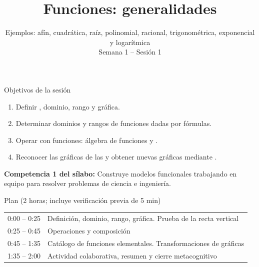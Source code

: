 \documentclass[10pt,aspectratio=169]{beamer}
\title[Funciones: generalidades]{Funciones: generalidades}
\subtitle{Ejemplos: afín, cuadrática, raíz, polinomial, racional, trigonométrica, exponencial y logarítmica\\[2pt]\small Semana 1 -- Sesión 1}
\begin{document}
\begin{frame}
  \titlepage
\end{frame}

\begin{frame}{Objetivos de la sesión}
  \begin{enumerate}
    \item Definir , dominio, rango y gráfica.
    \item Determinar dominios y rangos de funciones dadas por fórmulas.
    \item Operar con funciones: álgebra de funciones y .
    \item Reconocer las gráficas de las  y obtener nuevas gráficas mediante .
  \end{enumerate}
  \vspace{1mm}
  {\small\textbf{Competencia 1 del sílabo:} Construye modelos funcionales trabajando en equipo para resolver problemas de ciencia e ingeniería.}
  \begin{block}{Plan (2 horas; incluye verificación previa de 5 min)}
    \begin{tabular}{ll}
      0:00 -- 0:25 & Definición, dominio, rango, gráfica. Prueba de la recta vertical\\
      0:25 -- 0:45 & Operaciones y composición\\
      0:45 -- 1:35 & Catálogo de funciones elementales. Transformaciones de gráficas\\
      1:35 -- 2:00 & Actividad colaborativa, resumen y cierre metacognitivo
    \end{tabular}
  \end{block}
\end{frame}
\end{document}
